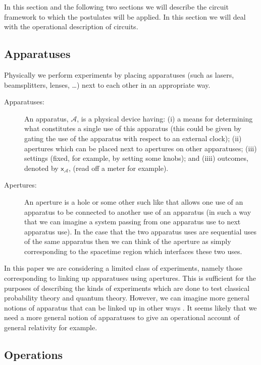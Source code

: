 \documentclass[10pt]{article}
\begin{document}
In this section and the following two sections we will describe the circuit framework to which the postulates will be applied.  In this section we will deal with the operational description of circuits.

\subsection{Apparatuses}


Physically we perform experiments by placing apparatuses (such as lasers, beamsplitters, lenses, \dots) next to each other in an appropriate way.
\begin{description}
\item[Apparatuses:] An apparatus, $\mathcal A$, is a physical device having: (i) a means for determining what constitutes a single use of this apparatus (this could be given by gating the use of the apparatus with respect to an external clock); (ii) apertures which can be placed next to apertures on other apparatuses; (iii) settings (fixed, for example, by setting some knobs); and (iiii) outcomes, denoted by $\mathsf x_{\mathcal A}$, (read off a meter for example).
\item[Apertures:] An aperture is a hole or some other such like that allows one use of an apparatus to be connected to another use of an apparatus (in such a way that we can imagine a system passing from one apparatus use to next apparatus use).  In the case that the two apparatus uses are sequential uses of the same apparatus then we can think of the aperture as simply corresponding to the spacetime region which interfaces these two uses.
\end{description}
In this paper we are considering a limited class of experiments, namely those corresponding to linking up apparatuses using apertures.
This is sufficient for the purposes of describing the kinds of experiments which are done to test classical probability theory and quantum theory.  However, we can imagine more general notions of apparatus that can be linked up in other ways \cite{hardy2009operational}. It seems likely that we need a more general notion of apparatuses to give an operational account of general relativity for example.

\subsection{Operations}\label{operations}
\end{document}
